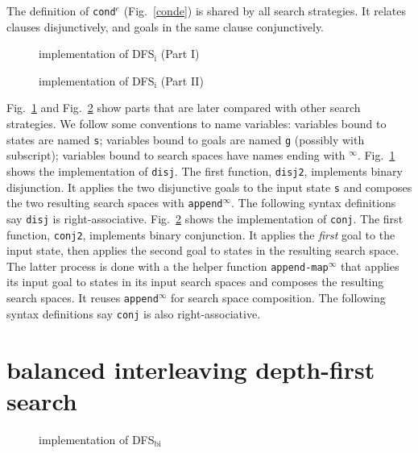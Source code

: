 \documentclass[format=acmlarge, review=true, authordraft=true]{acmart}
\newcommand{\conde}{\texttt{cond$^e$}}
\newcommand{\conj}{\texttt{conj}}
\newcommand{\disj}{\texttt{disj}}
\newcommand{\DFSi }[0]{DFS$_\textrm{i}$}
\newcommand{\DFSbi}[0]{DFS$_\textrm{bi}$}
\begin{document}
The definition of \conde{} (Fig.~\ref{conde}) is shared by all search 
strategies. It relates clauses disjunctively, and goals in the same 
clause conjunctively.

\begin{figure}
	
	\caption{implementation of \DFSi{} (Part I)}
	\label{DFSi-0}
\end{figure}

\begin{figure}
	
	\caption{implementation of \DFSi{} (Part II)}
	\label{DFSi-1}
\end{figure}


Fig.~\ref{DFSi-0} and Fig.~\ref{DFSi-1} show parts that are later compared 
with other search 
strategies. We follow some conventions to name variables: variables bound to 
states are named \texttt{s}; variables bound to goals are named \texttt{g} 
(possibly with subscript); variables bound to search spaces have names ending 
with $^\infty$. Fig.~\ref{DFSi-0} shows the implementation of \disj. The 
first function, \texttt{disj2}, implements binary disjunction. It applies the 
two disjunctive goals to the input state \texttt{s} and composes the two 
resulting search spaces with \texttt{append$^\infty$}. The following syntax 
definitions say \disj{} is right-associative. Fig.~\ref{DFSi-1} 
shows the implementation of \conj. The first function, \texttt{conj2}, 
implements binary conjunction. 
It applies the \emph{first} goal to the input state, then applies the second 
goal to states in the resulting search space. The latter process is done with a 
the helper function \texttt{append-map$^\infty$} that applies its input goal to states 
in its input search spaces and composes the resulting search spaces. It reuses 
\texttt{append$^\infty$} for search space composition. The following syntax 
definitions say \conj{} is also right-associative.

\section{balanced interleaving depth-first search}

\begin{figure}
	
	\caption{implementation of \DFSbi{}}
	\label{balanced-disj}
\end{figure}
\end{document}
